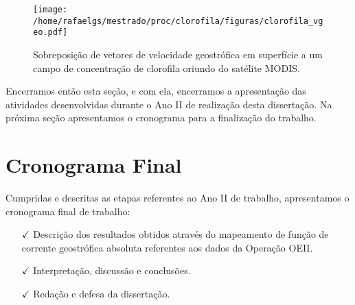 \documentclass[12pt,portuguese,a4paper,pdftex]{article}
\renewcommand{\baselinestretch}{1.5}
\begin{document}
\begin{figure}%
 \begin{center}
  \texttt{[image: /home/rafaelgs/mestrado/proc/clorofila/figuras/clorofila\_vgeo.pdf]}
 \end{center}
 \vspace{-.25cm}
 \renewcommand{\baselinestretch}{1}
 \caption{\label{fig:modis} \small Sobreposição de vetores de velocidade geostrófica em superfície a
um campo de concentração de clorofila oriundo do satélite MODIS.}
\end{figure}   

Encerramos então esta seção, e com ela, encerramos a apresentação das atividades desenvolvidas durante o Ano II de realização 
desta dissertação. Na próxima seção apresentamos o cronograma para a finalização do trabalho. 

\newpage
\section{Cronograma Final}\label{sec:cron_final}

\hspace{4mm} Cumpridas e descritas as etapas referentes ao Ano II de trabalho,
apresentamos o cronograma final de trabalho:

\begin{enumerate}

\item[$\checkmark$] Descrição dos resultados obtidos através do mapeamento de função de corrente geostrófica 
absoluta referentes aos dados da Operação OEII.

\item[$\checkmark$] Interpretação, discussão e conclusões.

\item[$\checkmark$] Redação e defesa da dissertação.

\end{enumerate}

\newpage
{}


\end{document}
